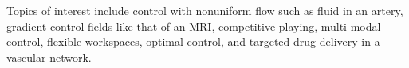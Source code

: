 Topics of interest include control with nonuniform flow such as fluid in an artery, gradient control fields like that of an MRI, competitive playing, multi-modal control, flexible workspaces, optimal-control, and targeted drug delivery in a vascular network.


%  





